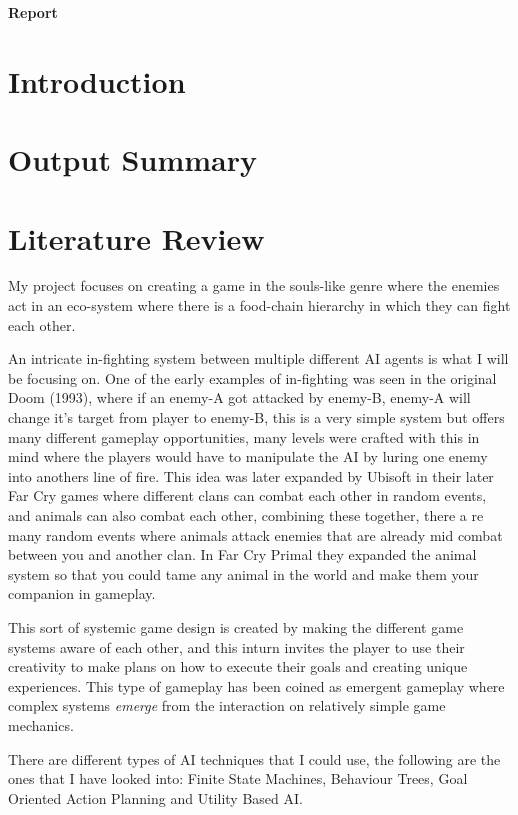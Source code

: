 \documentclass[10pt]{report}
\begin{document}
\begin{titlepage}
\center
{\huge\bfseries Report}  
\end{titlepage}
\tableofcontents

\chapter{Introduction}
\chapter{Output Summary}
\chapter{Literature Review}
My project focuses on creating a game in the souls-like genre where the enemies act in an eco-system where there is a food-chain hierarchy in which they can fight each other.

An intricate in-fighting system between multiple different AI agents is what I will be focusing on. One of the early examples of in-fighting was seen in the original Doom (1993)\cite{doom93}, where if an enemy-A got attacked by enemy-B, enemy-A will change it's target from player to enemy-B, this is a very simple system but offers many different gameplay opportunities, many levels were crafted with this in mind where the players would have to manipulate the AI by luring one enemy into anothers line of fire.
This idea was later expanded by Ubisoft in their later Far Cry games where different clans can combat each other in random events, and animals can also combat each other, combining these together, there a re many random events where animals attack enemies that are already mid combat between you and another clan. In Far Cry Primal they expanded the animal system so that you could tame any animal in the world and make them your companion in gameplay.

This sort of systemic game design is created by making the different game systems aware of each other, and this inturn invites the player to use their creativity to make plans on how to execute their goals and creating unique experiences. This type of gameplay has been coined as emergent gameplay where complex systems \textit{emerge} from the interaction on relatively simple game mechanics.\cite{emergentGameplay}

There are different types of AI techniques that I could use, the following are the ones that I have looked into: Finite State Machines, Behaviour Trees, Goal Oriented Action Planning and Utility Based AI.
\end{document}

